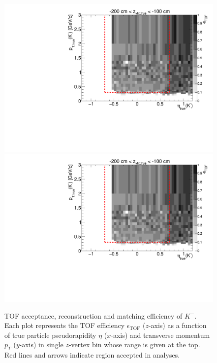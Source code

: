 \begin{figure}[hb]
\caption[TOF acceptance, reconstruction and matching efficiency of $K^{-}$.]{TOF acceptance, reconstruction and matching efficiency of $K^{-}$. Each plot represents the TOF efficiency $\epsilon_{\text{TOF}}$ ($z$-axis) as a function of true particle pseudorapidity $\eta$ ($x$-axis) and transverse momentum $p_{T}$ ($y$-axis) in single $z$-vertex bin whose range is given at the top. Red lines and arrows indicate region accepted in analyses.}\label{fig:tofEff_kaon_minus}
\centering
\parbox{0.495\textwidth}{
  \centering
  \includegraphics[width=\linewidth,page=3]{graphics/eff/Eff2D_TOF_kaon_Minus.pdf}\\
  \includegraphics[width=\linewidth,page=5]{graphics/eff/Eff2D_TOF_kaon_Minus.pdf}\\
}
\end{figure}
